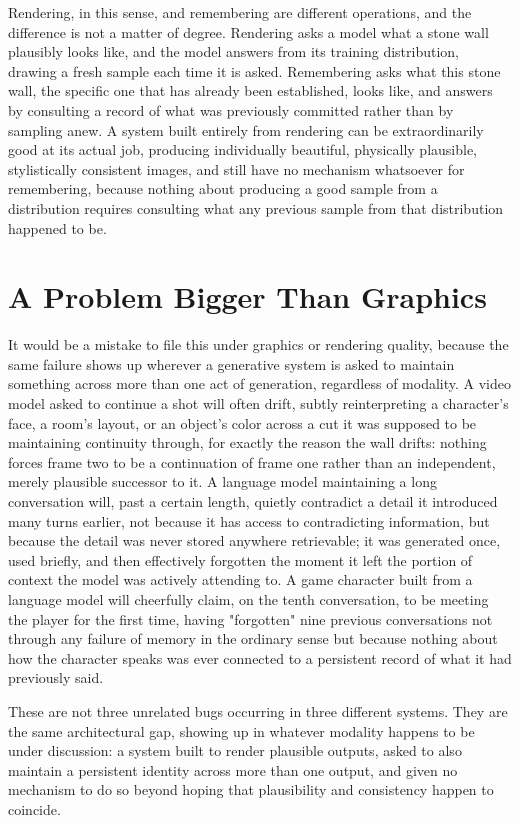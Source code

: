 Rendering, in this sense, and remembering are different operations, and the difference is not a matter of degree. Rendering asks a model what a stone wall plausibly looks like, and the model answers from its training distribution, drawing a fresh sample each time it is asked. Remembering asks what this stone wall, the specific one that has already been established, looks like, and answers by consulting a record of what was previously committed rather than by sampling anew. A system built entirely from rendering can be extraordinarily good at its actual job, producing individually beautiful, physically plausible, stylistically consistent images, and still have no mechanism whatsoever for remembering, because nothing about producing a good sample from a distribution requires consulting what any previous sample from that distribution happened to be.

\section{A Problem Bigger Than Graphics}

It would be a mistake to file this under graphics or rendering quality, because the same failure shows up wherever a generative system is asked to maintain something across more than one act of generation, regardless of modality. A video model asked to continue a shot will often drift, subtly reinterpreting a character's face, a room's layout, or an object's color across a cut it was supposed to be maintaining continuity through, for exactly the reason the wall drifts: nothing forces frame two to be a continuation of frame one rather than an independent, merely plausible successor to it. A language model maintaining a long conversation will, past a certain length, quietly contradict a detail it introduced many turns earlier, not because it has access to contradicting information, but because the detail was never stored anywhere retrievable; it was generated once, used briefly, and then effectively forgotten the moment it left the portion of context the model was actively attending to. A game character built from a language model will cheerfully claim, on the tenth conversation, to be meeting the player for the first time, having "forgotten" nine previous conversations not through any failure of memory in the ordinary sense but because nothing about how the character speaks was ever connected to a persistent record of what it had previously said.

These are not three unrelated bugs occurring in three different systems. They are the same architectural gap, showing up in whatever modality happens to be under discussion: a system built to render plausible outputs, asked to also maintain a persistent identity across more than one output, and given no mechanism to do so beyond hoping that plausibility and consistency happen to coincide.

